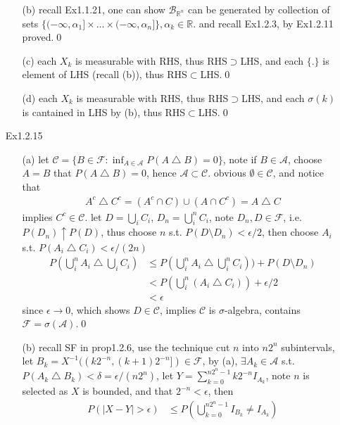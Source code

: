 \documentclass[paper=a4, fontsize=11pt]{scrartcl} %
\numberwithin{equation}{section} %
\numberwithin{figure}{section} %
\numberwithin{table}{section} %
\begin{document}
\begin{itemize}
\begin{itemize}
	 	\item[(b)] recall Ex1.1.21, one can show $\mathcal{B}_{\mathbb{R}^n}$ can be generated by collection of sets $\{(-\infty,\alpha_1]\times\dots\times(-\infty,\alpha_n]\},\alpha_k\in \mathbb{R}$. and recall Ex1.2.3, by Ex1.2.11 proved.\qed
	 	\item[(c)] each $X_k$ is measurable with RHS, thus RHS$\supset$LHS, and each $\{.\}$ is element of LHS (recall (b)), thus RHS$\subset$LHS.\qed
	 	\item[(d)] each $X_k$ is measurable with RHS, thus RHS$\supset$LHS, and each $\sigma(k)$ is cantained in LHS by (b), thus RHS$\subset$LHS.\qed
	 \end{itemize}
	 \item[Ex1.2.15]
	 \begin{itemize}
	 	\item[(a)] let $\mathcal{C}=\{B\in\mathcal{F}: \inf_{A\in\mathcal{A}} P(A\bigtriangleup B)=0\}$, note if $B\in\mathcal{A}$, choose $A=B$ that $P(A\bigtriangleup B)=0$, hence $\mathcal{A}\subset \mathcal{C}$. obvious $\emptyset\in \mathcal{C}$, and notice that
	 	\begin{align}
	 		A^c\bigtriangleup C^c = (A^c\cap C) \cup (A\cap C^c) = A \bigtriangleup C
	 	\end{align}
	 	implies $C^c\in \mathcal{C}$. let $D= \bigcup_i C_i$, $D_n= \bigcup_i^n C_i$, note $D_n,D\in\mathcal{F}$, i.e. $P(D_n)\uparrow P(D)$, thus choose $n$ s.t. $P(D\setminus D_n)< \epsilon/2$, then choose $A_i$ s.t. $P(A_i\bigtriangleup C_i)<\epsilon/(2n)$
	 	\begin{align}
	 		P(\bigcup_i^n A_i \bigtriangleup \bigcup_i C_i) &\leq P(\bigcup_i^n A_i\bigtriangleup \bigcup_i^n C_i)) + P(D\setminus D_n)\\
	 		&< P(\bigcup_i^n (A_i\bigtriangleup  C_i)) + \epsilon/2\\
	 		&< \epsilon
	 	\end{align}
	 	since $\epsilon\rightarrow 0$, which shows $D\in \mathcal{C}$, implies $\mathcal{C}$ is $\sigma$-algebra, contains $\mathcal{F}=\sigma(\mathcal{A})$.\qed
	 	\item[(b)] recall SF in prop1.2.6, use the technique cut $n$ into $n2^n$ subintervals, let $B_k = X^{-1}((k2^{-n},(k+1)2^{-n}])\in \mathcal{F}$, by (a), $\exists A_k\in\mathcal{A}$ s.t. $P(A_k\bigtriangleup B_k)<\delta=\epsilon/(n2^n)$, let $Y=\sum_{k=0}^{n2^n-1}k2^{-n} I_{A_k}$, note $n$ is selected as $X$ is bounded, and that $2^{-n}<\epsilon$, then
	 	\begin{align}
	 		P(|X-Y|>\epsilon)&\leq P(\bigcup_{k=0}^{n2^n-1} I_{B_k}\neq I_{A_k}) \\

\end{align}
\end{itemize}
\end{itemize}
\end{document}
